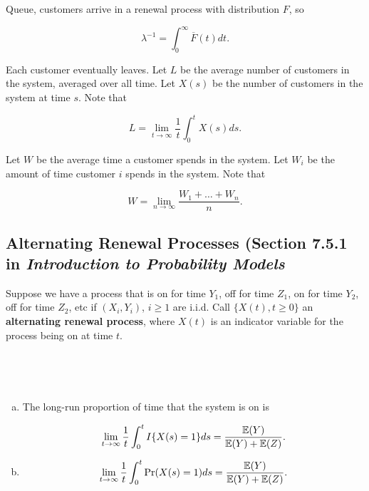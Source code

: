 \begin{exercise} Queue, customers arrive in a renewal process with distribution \(F\), so 

\[
\lambda^{-1} = \int_0^\infty \overline{F}(t) dt.
\]

Each customer eventually leaves. Let \(L\) be the average number of customers in the system, averaged over all time. Let \(X(s)\) be the number of customers in the system at time \(s\). Note that

\[
L = \lim_{t \to \infty} \frac{1}{t} \int_0^t X(s) ds.
\]

Let \(W\) be the average time a customer spends in the system. Let \(W_i\) be the amount of time customer \(i\) spends in the system. Note that

\[
W = \lim_{n \to \infty} \frac{W_1 + \ldots + W_n}{n}.
\]



\end{exercise}


\begin{solution}

\end{solution}

\subsection{Alternating Renewal Processes (Section 7.5.1 in \textit{Introduction to Probability Models}}

\begin{definition} Suppose we have a process that is on for time \(Y_1\), off for time \(Z_1\), on for time \(Y_2\), off for time \(Z_2\), etc if \((X_i, Y_i)\), \(i \geq 1\) are i.i.d. Call \(\{X(t), t \geq 0\}\) an \textbf{alternating renewal process}, where \(X(t)\) is an indicator variable for the process being on at time \(t\).

\end{definition}

\


\begin{proposition}\label{stoch.prop.7.4}

\

\begin{enumerate}[(a)]

\item The long-run proportion of time that the system is on is

\[
\lim_{t \to \infty} \frac{1}{t} \int_0^t I\{X(s) = 1 \} ds =  \frac{\mathbb{E}(Y)}{\mathbb{E}(Y) + \mathbb{E}(Z)}.
\]

\item \[
\lim_{t \to \infty} \frac{1}{t} \int_0^t \Pr(X(s) = 1)  ds  =  \frac{\mathbb{E}(Y)}{\mathbb{E}(Y) + \mathbb{E}(Z)}.
\]


\end{enumerate}

\end{proposition}

